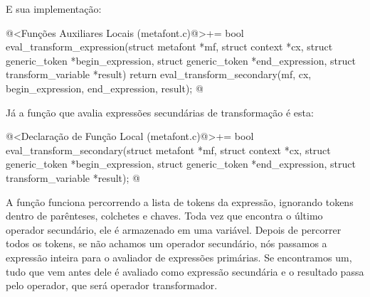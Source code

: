 E sua implementação:

\iniciocodigo
@<Funções Auxiliares Locais (metafont.c)@>+=
bool eval_transform_expression(struct metafont *mf, struct context *cx,
                               struct generic_token *begin_expression,
                               struct generic_token *end_expression,
                               struct transform_variable *result){
  return eval_transform_secondary(mf, cx, begin_expression, end_expression,
                                  result);
}
@
\fimcodigo

Já a função que avalia expressões secundárias de transformação é esta:

\iniciocodigo
@<Declaração de Função Local (metafont.c)@>+=
bool eval_transform_secondary(struct metafont *mf, struct context *cx,
                              struct generic_token *begin_expression,
                              struct generic_token *end_expression,
                              struct transform_variable *result);
@
\fimcodigo

A função funciona percorrendo a lista de tokens da expressão,
ignorando tokens dentro de parênteses, colchetes e chaves. Toda vez
que encontra o último operador secundário, ele é armazenado em uma
variável. Depois de percorrer todos os tokens, se não achamos um
operador secundário, nós passamos a expressão inteira para o avaliador
de expressões primárias. Se encontramos um, tudo que vem antes dele é
avaliado como expressão secundária e o resultado passa pelo operador,
que será operador transformador.

